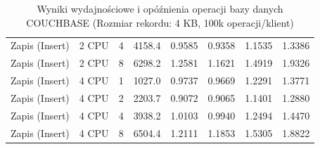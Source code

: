 \begin{table}[ht]
{\begin{tabular}{llcrrrrr}
Zapis (Insert) & 2 CPU & 4 & 4158.4 & 0.9585 & 0.9358 & 1.1535 & 1.3386 \\
Zapis (Insert) & 2 CPU & 8 & 6298.2 & 1.2581 & 1.1621 & 1.4919 & 1.9326 \\
Zapis (Insert) & 4 CPU & 1 & 1027.0 & 0.9737 & 0.9669 & 1.2291 & 1.3771 \\
Zapis (Insert) & 4 CPU & 2 & 2203.7 & 0.9072 & 0.9065 & 1.1401 & 1.2880 \\
Zapis (Insert) & 4 CPU & 4 & 3938.2 & 1.0103 & 0.9940 & 1.2494 & 1.4470 \\
Zapis (Insert) & 4 CPU & 8 & 6504.4 & 1.2111 & 1.1853 & 1.5305 & 1.8822 \\
\bottomrule
\end{tabular}%
}
\caption{Wyniki wydajnościowe i opóźnienia operacji bazy danych COUCHBASE (Rozmiar rekordu: 4 KB, 100k operacji/klient)}
\label{tab:latency_couchbase_medium_100000}
\end{table}
